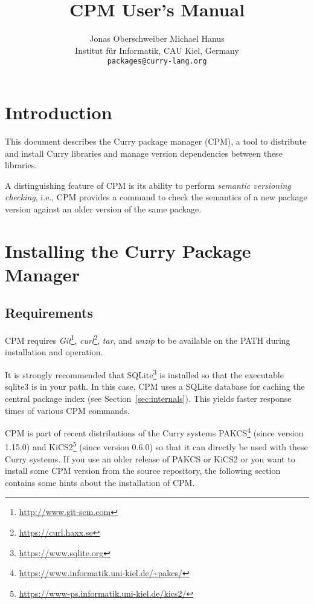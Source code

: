 \documentclass[11pt]{article}
\renewcommand{\tt}{\usefont{OT1}{cmtt}{m}{n}\selectfont}
\newcommand{\codefont}{\small\tt}
\newcommand{\code}[1]{\mbox{\codefont #1}}
\begin{document}
\title{CPM User's Manual}

\author{Jonas Oberschweiber \qquad Michael Hanus\\[1ex]
{\small Institut f\"ur Informatik, CAU Kiel, Germany}\\[1ex]
{\small\texttt{packages@curry-lang.org}}
}

\maketitle

\tableofcontents

\clearpage


\section{Introduction}

This document describes the Curry package manager (CPM), a tool to
distribute and install Curry libraries and manage version dependencies
between these libraries.

A distinguishing feature of CPM is its ability to perform
\emph{semantic versioning checking}, i.e., CPM provides a command
to check the semantics of a new package version against an
older version of the same package.


\bigskip\bigskip

\section{Installing the Curry Package Manager}

\subsection{Requirements}

CPM requires
\emph{Git}\footnote{\url{http://www.git-scm.com}},
\emph{curl}\footnote{\url{https://curl.haxx.se}},
\emph{tar},
and \emph{unzip} to be available on the \code{PATH} during installation and 
operation.

It is strongly recommended that
SQLite\footnote{\url{https://www.sqlite.org}} is installed
so that the executable \code{sqlite3} is in your path.
In this case, CPM uses a SQLite database for caching
the central package index (see Section~\ref{sec:internals}).
This yields faster response times of various CPM commands.

CPM is part of recent distributions of the Curry systems
PAKCS\footnote{\url{https://www.informatik.uni-kiel.de/~pakcs/}}
(since version 1.15.0)
and
KiCS2\footnote{\url{https://www-ps.informatik.uni-kiel.de/kics2/}}
(since version 0.6.0) so that it can directly be used with
these Curry systems.
If you use an older release of PAKCS or KiCS2 or you want to
install some CPM version from the source repository,
the following section contains some hints about the installation of CPM.
\end{document}
